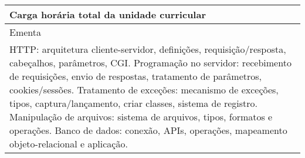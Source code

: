 \begin{quadro}[ht!]
\begin{tabular}{|p{3cm} p{2cm} p{3cm} p{2cm} p{3cm} p{2cm}|}
\multicolumn{5}{|p{13cm}|}{\cellcolor{blue1} Carga horária total da unidade curricular} & \multicolumn{1}{p{1cm}|}{\raggedleft 60	}\\\hline
\multicolumn{6}{|p{15cm}|}{\cellcolor{blue1} Ementa} \\\hline
\hline\multicolumn{6}{|p{15cm}|}{\scriptsize HTTP: arquitetura cliente-servidor, definições, requisição/resposta, cabeçalhos, parâmetros, CGI. Programação no servidor: recebimento de requisições, envio de respostas, tratamento de parâmetros, cookies/sessões. Tratamento de exceções: mecanismo de exceções, tipos, captura/lançamento, criar classes, sistema de registro. Manipulação de arquivos: sistema de arquivos, tipos, formatos e operações. Banco de dados: conexão, APIs, operações, mapeamento objeto-relacional e aplicação.}\\\hline
\hline
	\end{tabular}
\end{quadro}
\clearpage
